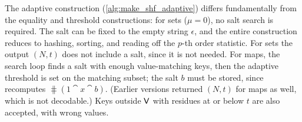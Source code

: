 \begin{algorithm}[ht]
    \caption{Unified BHF construction (adaptive threshold predicate)}
    \label{alg:make_shf_adaptive}
    \DontPrintSemicolon
\end{algorithm}

\begin{remark}
The adaptive construction (\cref{alg:make_shf_adaptive}) differs fundamentally
from the equality and threshold constructions: for sets ($\mu = 0$), no salt
search is required.
The salt can be fixed to the empty string $\epsilon$, and the entire
construction reduces to hashing, sorting, and reading off the $p$-th order
statistic.
For sets the output $(N, t)$ does not include a salt, since it is not needed.
For maps, the search loop finds a salt with enough value-matching keys, then
the adaptive threshold is set on the matching subset; the salt $b$ must be
stored, since \Find recomputes $\hash(1 \cat x \cat b)$.
(Earlier versions returned $(N, t)$ for maps as well, which is not decodable.)
Keys outside $\Set{V}$ with residues at or below $t$ are also accepted, with
wrong values.
\end{remark}

